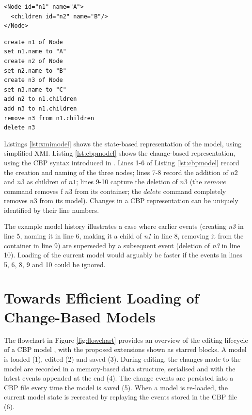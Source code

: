 \vspace{-20pt}
\begin{minipage}[t]{0.5\linewidth}
\begin{lstlisting}[style=xmi,caption={State-based tree model.},label=lst:xmimodel]
<Node id="n1" name="A">
  <children id="n2" name="B"/>
</Node>
\end{lstlisting}
\end{minipage}
\hfill
\begin{minipage}[t]{0.5\linewidth}
\begin{lstlisting}[style=eol,caption={Change-based tree model.},label=lst:cbpmodel]
create n1 of Node
set n1.name to "A"  
create n2 of Node
set n2.name to "B"  
create n3 of Node
set n3.name to "C"  
add n2 to n1.children   
add n3 to n1.children
remove n3 from n1.children   
delete n3
\end{lstlisting}
\end{minipage}

Listings \ref{lst:xmimodel} shows the state-based representation of the model, using simplified XMI. Listing \ref{lst:cbpmodel} shows the change-based representation, using the CBP syntax introduced in \cite{yohannis2017turning}. Lines 1-6 of Listing \ref{lst:cbpmodel} record the creation and naming of the three nodes; lines 7-8 record the addition of $n2$ and $n3$ as children of $n1$; lines 9-10 capture the deletion of $n3$ (the $remove$ command removes f $n3$ from its container; the $delete$ command completely removes $n3$ from its model). Changes in a CBP representation can be uniquely identified by their line numbers.

The example model history illustrates a case where  earlier events (creating \emph{n3} in line 5, naming it in line 6, making it a child of \emph{n1} in line 8, removing it from the container in line 9) are superseded by a subsequent event (deletion of \emph{n3} in line 10).  Loading of the current model would arguably be faster if the events in lines 5, 6, 8, 9 and 10 could be ignored.

\section{Towards Efficient Loading of Change-Based Models}
\label{sec:loading_time_optimisation}

The flowchart in Figure \ref{fig:flowchart} provides an overview of the editing lifecycle of a CBP model \cite{yohannis2017turning}, with the proposed extensions shown as starred blocks. A model is loaded (1), edited (2) and saved (3).  During editing, the changes made to the model are recorded in a memory-based data structure, serialised and with the latest events appended at the end (4). The change events are persisted into a CBP file every time the model is saved (5). When a model is re-loaded, the current model state is recreated by replaying the events stored in the CBP file (6).

